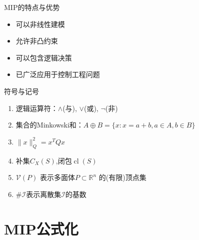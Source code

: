 \documentclass[notheorems,11pt]{beamer}
\theoremstyle{plain}
\numberwithin{theorem}{section}
\numberwithin{lemma}{section}
\numberwithin{corollary}{section}
\theoremstyle{example}
\begin{document}
\begin{frame}{MIP的特点与优势}
\begin{itemize}
  \item 可以非线性建模
  \item 允许非凸约束
  \item 可以包含逻辑决策
  \item 已广泛应用于控制工程问题
\end{itemize}
\end{frame}

\begin{frame}{符号与记号}
  \begin{enumerate}
    \item 逻辑运算符：$\wedge$(与), $\vee$(或), $\neg$(非)
    \item 集合的Minkowski和：$A\oplus B=\{x:x=a+b,a\in A,b\in B\}$
    \item $\|x\|^2_Q=x^TQx$
    \item 补集$C_X(S)$,闭包$\operatorname{cl}(S)$
    \item $\mathcal{V}(P)$ 表示多面体$P\subset \mathbb{R}^n$ 的(有限)顶点集
    \item $\#\mathcal{I}$表示离散集$\mathcal{I}$的基数
  \end{enumerate}
  \vspace{1 em}
  
\end{frame}

\section{MIP公式化}
\end{document}
